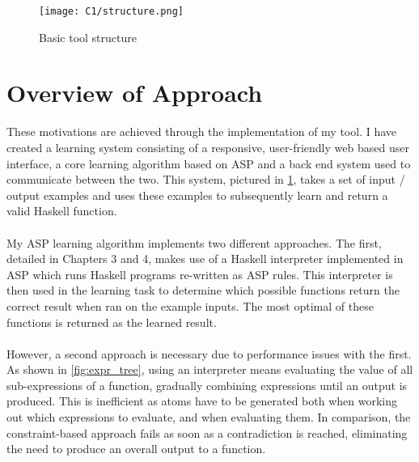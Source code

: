 \begin{figure}[h!]
\centering
\texttt{[image: C1/structure.png]}
\caption{Basic tool structure}
\label{fig:structure}
\end{figure}

\section{Overview of Approach}

These motivations are achieved through the implementation of my tool. I have created a learning system consisting of a responsive, user-friendly web based user interface, a core learning algorithm based on ASP and a back end system used to communicate between the two. This system, pictured in \ref{fig:structure}, takes a set of input / output examples and uses these examples to subsequently learn and return a valid Haskell function. \\ \\
My ASP learning algorithm implements two different approaches. The first, detailed in Chapters 3 and 4, makes use of a Haskell interpreter implemented in ASP which runs Haskell programs re-written as ASP rules. This interpreter is then used in the learning task to determine which possible functions return the correct result when ran on the example inputs. The most optimal of these functions is returned as the learned result. \\ \\
However, a second approach is necessary due to performance issues with the first. As shown in \ref{fig:expr_tree}, using an interpreter means evaluating the value of all sub-expressions of a function, gradually combining expressions until an output is produced. This is inefficient as atoms have to be generated both when working out which expressions to evaluate, and when evaluating them. In comparison, the constraint-based approach fails as soon as a contradiction is reached, eliminating the need to produce an overall output to a function.

